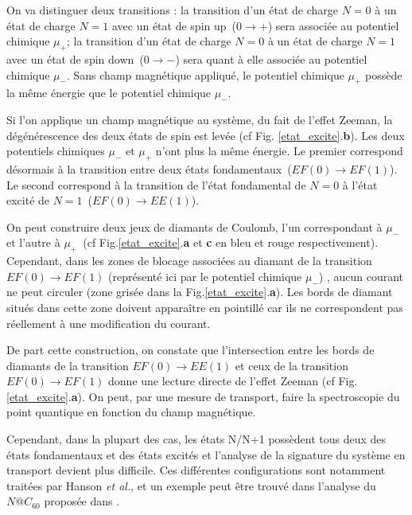 On va distinguer deux transitions : la transition d'un état de charge $N=0$ à un état de charge $N=1$ avec un état de spin up~($0\rightarrow +$) sera associée au potentiel chimique $\mu_{+}$; la transition d'un état de charge $N=0$ à un état de charge $N=1$ avec un état de spin down~($0\rightarrow -$) sera quant à elle associée au potentiel chimique $\mu_{-}$. Sans champ magnétique appliqué, le potentiel chimique $\mu_{+}$ possède la m\^eme énergie que le potentiel chimique  $\mu_{-}$.

Si l'on applique un champ magnétique au système, du fait de l'effet Zeeman, la dégénérescence des deux états de spin est levée (cf Fig. \ref{etat_excite}.\textbf{b}). Les deux potentiels chimiques $\mu_{-}$ et $\mu_{+}$ n'ont plus la même énergie. Le premier correspond désormais à la transition entre deux états fondamentaux~($EF(0)\rightarrow EF(1)$). Le second correspond à la transition de l'état fondamental de $N=0$ à l'état excité de $N=1$~($EF(0)\rightarrow EE(1)$).

On peut construire deux jeux de diamants de Coulomb, l'un correspondant à $\mu_{-}$ et l'autre à $\mu_{+}$~(cf Fig.\ref{etat_excite}.\textbf{a} et \textbf{c} en bleu et rouge respectivement). Cependant, dans les zones de blocage associées au diamant de la transition $EF(0)\rightarrow EF(1)$ (représenté ici par le potentiel chimique $\mu_{-}$) , aucun courant ne peut circuler (zone grisée dans la Fig.\ref{etat_excite}.\textbf{a}). Les bords de diamant situés dans cette zone doivent apparaître en pointillé car ils ne correspondent pas réellement à une modification du courant.

De part cette construction, on constate que l'intersection entre les bords de diamants de la transition $EF(0)\rightarrow EE(1)$ et ceux de la transition $EF(0)\rightarrow EF(1)$ donne une lecture directe de l'effet Zeeman (cf Fig.\ref{etat_excite}.\textbf{a}). On peut, par une mesure de transport, faire la spectroscopie du point quantique en fonction du champ magnétique.

 Cependant, dans la plupart des cas, les états N/N+1 possèdent tous deux des états fondamentaux et des états excités et l'analyse de la signature du système en transport devient plus difficile. Ces différentes configurations sont notamment traitées par Hanson \textit{et al.}, et un exemple peut \^etre trouvé dans l'analyse du $N@C_{60}$ proposée dans \cite{Grose2008}.

